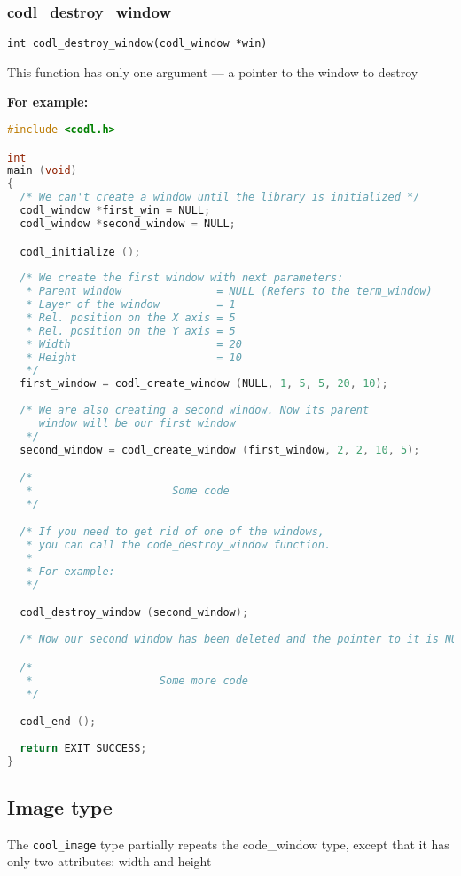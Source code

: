 \documentclass{article}
\newcommand{\fstep}{\vspace{3mm}\noindent}
\begin{document}
\subsubsection{codl\_destroy\_window}
{\tt int codl\_destroy\_window(codl\_window *win)}

\fstep{} This function has only one argument --- a pointer to the window to destroy

\newpage

{\vspace{5mm}\noindent\bf\large For example:}

\begin{lstlisting}[language=C]
#include <codl.h>

int
main (void)
{ 
  /* We can't create a window until the library is initialized */
  codl_window *first_win = NULL; 
  codl_window *second_window = NULL;

  codl_initialize ();
  
  /* We create the first window with next parameters:
   * Parent window               = NULL (Refers to the term_window) 
   * Layer of the window         = 1
   * Rel. position on the X axis = 5
   * Rel. position on the Y axis = 5
   * Width                       = 20
   * Height                      = 10 
   */
  first_window = codl_create_window (NULL, 1, 5, 5, 20, 10);
  
  /* We are also creating a second window. Now its parent 
     window will be our first window
   */
  second_window = codl_create_window (first_window, 2, 2, 10, 5);

  /*
   *                      Some code
   */

  /* If you need to get rid of one of the windows,
   * you can call the code_destroy_window function.
   * 
   * For example:
   */

  codl_destroy_window (second_window);
  
  /* Now our second window has been deleted and the pointer to it is NULL */

  /*
   *                    Some more code
   */

  codl_end ();
  
  return EXIT_SUCCESS;
}
\end{lstlisting}

\newpage

\subsection{Image type}
The {\tt cool\_image} type partially repeats the code\_window type, except that
it has only two attributes: width and height
\end{document}

